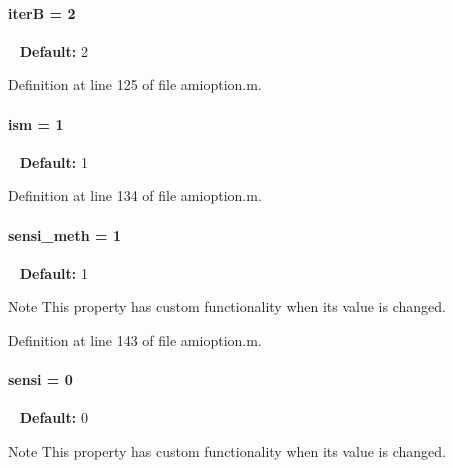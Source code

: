\paragraph[{iter\+B}]{\setlength{\rightskip}{0pt plus 5cm}iter\+B = 2}\label{classamioption_ae6a49cec21ffe790217be29b0fced832}
~\newline
{\bfseries Default\+:} 2 

Definition at line 125 of file amioption.\+m.

\hypertarget{classamioption_aada9d6834569ad5c542cb8dc6b26ea46}{}
\paragraph[{ism}]{\setlength{\rightskip}{0pt plus 5cm}ism = 1}\label{classamioption_aada9d6834569ad5c542cb8dc6b26ea46}
~\newline
{\bfseries Default\+:} 1 

Definition at line 134 of file amioption.\+m.

\hypertarget{classamioption_ab31e219eb42bc06629c3f247a01b9906}{}
\paragraph[{sensi\+\_\+meth}]{\setlength{\rightskip}{0pt plus 5cm}sensi\+\_\+meth = 1}\label{classamioption_ab31e219eb42bc06629c3f247a01b9906}
~\newline
{\bfseries Default\+:} 1

\begin{DoxyNote}{Note}
This property has custom functionality when its value is changed. 
\end{DoxyNote}


Definition at line 143 of file amioption.\+m.

\hypertarget{classamioption_a7dd31d33463c5a709251bcef0eccaa36}{}
\paragraph[{sensi}]{\setlength{\rightskip}{0pt plus 5cm}sensi = 0}\label{classamioption_a7dd31d33463c5a709251bcef0eccaa36}
~\newline
{\bfseries Default\+:} 0

\begin{DoxyNote}{Note}
This property has custom functionality when its value is changed. 
\end{DoxyNote}


